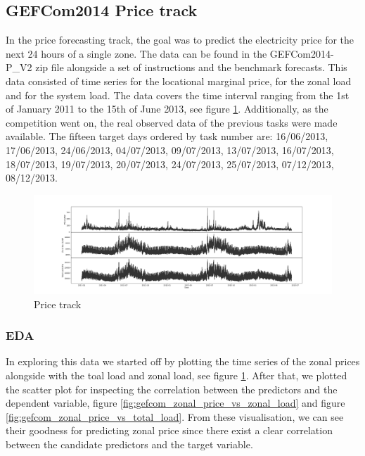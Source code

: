 \subsection{GEFCom2014 Price track}
In the price forecasting track, the goal was to predict the electricity price for the next 24 hours of a single zone. 
The data can be found in the GEFCom2014-P\_V2 zip file alongside a set of instructions and the benchmark forecasts.
This data consisted of time series for the locational marginal price, for the zonal load and for the system load. The data covers the time interval ranging from the 1st of January 2011 to the 15th of June 2013, see figure \ref{fig:price_track_fig1}. 
Additionally, as the competition went on, the real observed data of the previous tasks were made available.
The fifteen target days ordered by task number are: 16/06/2013, 17/06/2013, 24/06/2013, 04/07/2013, 09/07/2013, 13/07/2013, 16/07/2013, 18/07/2013, 19/07/2013, 20/07/2013, 24/07/2013, 25/07/2013, 07/12/2013, 08/12/2013. 
\begin{figure}[!h]
    \includegraphics[width=\textwidth]{images/price_track_fig1.png}
    \caption{Price track}
    \label{fig:price_track_fig1}
\end{figure}
\subsubsection{EDA}
In exploring this data we started off by plotting the time series of the zonal prices alongside with the toal load and zonal load, see figure \ref{fig:price_track_fig1}.
After that, we plotted the scatter plot for inspecting the correlation between the predictors and the dependent variable, figure \ref{fig:gefcom_zonal_price_vs_zonal_load} and figure \ref{fig:gefcom_zonal_price_vs_total_load}. From these visualisation, we can see their goodness for predicting zonal price since there exist a clear correlation between the candidate predictors and the target variable.

